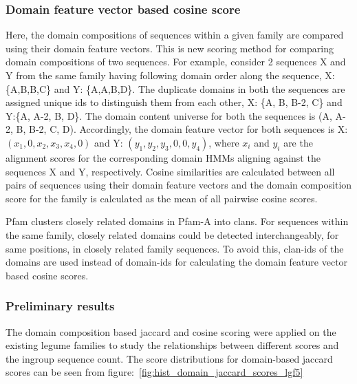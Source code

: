 \documentclass{article}
\begin{document}
		\subsubsection{Domain feature vector based cosine score}
		Here, the domain compositions of sequences within a given family are compared using their domain feature vectors. This is new scoring method for comparing domain compositions of two sequences. For example, consider 2 sequences X and Y from the same family having following domain order along the sequence, X: \{A,B,B,C\} and Y: \{A,A,B,D\}. The duplicate domains in both the sequences are assigned unique ids to distinguish them from each other, X: \{A, B, B-2, C\} and Y:\{A, A-2, B, D\}. The domain content universe for both the sequences is (A, A-2, B, B-2, C, D). Accordingly, the domain feature vector for both sequences is X: $(x_{1}, 0, x_{2}, x_{3}, x_{4}, 0)$ and Y: $(y_{1}, y_{2}, y_{3}, 0, 0, y_{4})$, where $x_{i}$ and $y_{i}$ are the alignment scores for the corresponding domain HMMs aligning against the sequences X and Y, respectively. Cosine similarities are calculated between all pairs of sequences using their domain feature vectors and the domain composition score for the family is calculated as the mean of all pairwise cosine scores.
		
		Pfam clusters closely related domains in Pfam-A into clans. For sequences within the same family, closely related domains could be  detected interchangeably, for same positions, in closely related family sequences. To avoid this, clan-ids of the domains are used instead of domain-ids for calculating the domain feature vector based cosine scores.
		
		\subsubsection{Preliminary results}
		The domain composition based jaccard and cosine scoring were applied on the existing legume families to study the relationships between different scores and the ingroup sequence count. The score distributions for domain-based jaccard scores can be seen from figure:~\ref{fig:hist_domain_jaccard_scores_lgf5}
		
\end{document}
